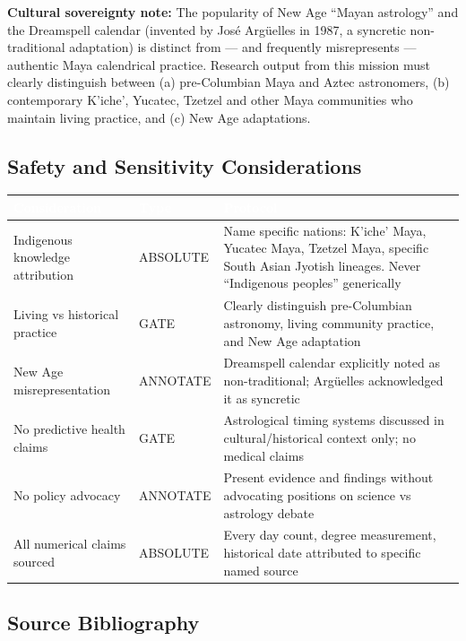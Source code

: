 \documentclass[11pt,letterpaper]{article}
\newcommand{\tableheader}[1]{\textbf{\sffamily\textcolor{white}{#1}}}
\begin{document}
\textbf{Cultural sovereignty note:} The popularity of New Age ``Mayan astrology'' and the Dreamspell calendar (invented by José Argüelles in 1987, a syncretic non-traditional adaptation) is distinct from --- and frequently misrepresents --- authentic Maya calendrical practice. Research output from this mission must clearly distinguish between (a) pre-Columbian Maya and Aztec astronomers, (b) contemporary K'iche', Yucatec, Tzetzel and other Maya communities who maintain living practice, and (c) New Age adaptations.

\subsection{Safety and Sensitivity Considerations}

\begin{center}
\begin{tabularx}{\textwidth}{L{3.5cm}L{2cm}X}
\toprule
{}
\tableheader{Consideration} & \tableheader{Type} & \tableheader{Protocol} \\
\midrule
Indigenous knowledge attribution & ABSOLUTE & Name specific nations: K'iche' Maya, Yucatec Maya, Tzetzel Maya, specific South Asian Jyotish lineages. Never ``Indigenous peoples'' generically \\
Living vs historical practice & GATE & Clearly distinguish pre-Columbian astronomy, living community practice, and New Age adaptation \\
New Age misrepresentation & ANNOTATE & Dreamspell calendar explicitly noted as non-traditional; Argüelles acknowledged it as syncretic \\
No predictive health claims & GATE & Astrological timing systems discussed in cultural/historical context only; no medical claims \\
No policy advocacy & ANNOTATE & Present evidence and findings without advocating positions on science vs astrology debate \\
All numerical claims sourced & ABSOLUTE & Every day count, degree measurement, historical date attributed to specific named source \\
\bottomrule
\end{tabularx}
\end{center}

\subsection{Source Bibliography}
\end{document}
